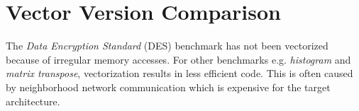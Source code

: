 




\section{Vector Version Comparison}
The \emph{Data Encryption Standard} (DES) benchmark has not been vectorized because of irregular memory accesses. For other benchmarks e.g. \emph{histogram} and \emph{matrix transpose}, vectorization results in less efficient code. This is often caused by neighborhood network communication which is expensive for the target architecture.

